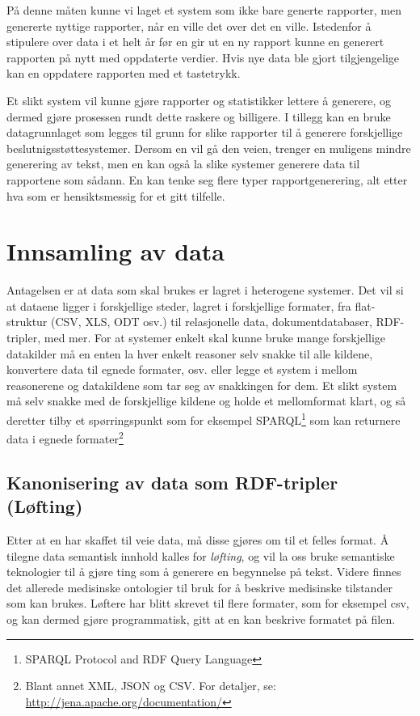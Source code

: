 \documentclass[11pt]{article}
\begin{document}
På denne måten kunne vi laget et system som ikke bare generte rapporter, men genererte nyttige rapporter, når en ville det over det en ville.
Istedenfor å stipulere over data i et helt år før en gir ut en ny rapport kunne en generert rapporten på nytt med oppdaterte verdier. Hvis nye data ble gjort tilgjengelige kan en oppdatere rapporten med et tastetrykk.

Et slikt system vil kunne gjøre rapporter og statistikker lettere å generere, og dermed gjøre prosessen rundt dette raskere og billigere.
I tillegg kan en bruke datagrunnlaget som legges til grunn for slike rapporter til å generere forskjellige beslutnigsstøttesystemer. Dersom en vil gå den veien, trenger en muligens mindre generering av tekst, men en kan også la slike systemer generere data til rapportene som sådann. En kan tenke seg flere typer rapportgenerering, alt etter hva som er hensiktsmessig for et gitt tilfelle.

\section{Innsamling av data}
Antagelsen er at data som skal brukes er lagret i heterogene systemer.
Det vil si at dataene ligger i forskjellige steder, lagret i forskjellige formater, fra flat-struktur (CSV, XLS, ODT osv.) til relasjonelle data, dokumentdatabaser, RDF-tripler, med mer.
For at systemer enkelt skal kunne bruke mange forskjellige datakilder må en enten la hver enkelt reasoner selv snakke til alle kildene, konvertere data til egnede formater, osv. eller legge et system i mellom reasonerene og datakildene som tar seg av snakkingen for dem. Et slikt system må selv snakke med de forskjellige kildene og holde et mellomformat klart, og så deretter tilby et spørringspunkt som for eksempel SPARQL\footnote{SPARQL Protocol and RDF Query Language} som kan returnere data i egnede formater\footnote{Blant annet XML, JSON og CSV. For detaljer, se: \url{http://jena.apache.org/documentation/}}

\subsection{Kanonisering av data som RDF-tripler (Løfting)}
Etter at en har skaffet til veie data, må disse gjøres om til et felles format. Å tilegne data semantisk innhold kalles for \emph{løfting}, og vil la oss bruke semantiske teknologier til å gjøre ting som å generere en begynnelse på tekst.\cite{repgenmiakt} Videre finnes det allerede medisinske ontologier\cite{medont} til bruk for å beskrive medisinske tilstander som kan brukes.
Løftere har blitt skrevet til flere formater, som for eksempel csv\cite{tarql}, og kan dermed gjøre programmatisk, gitt at en kan beskrive formatet på filen.
\end{document}

